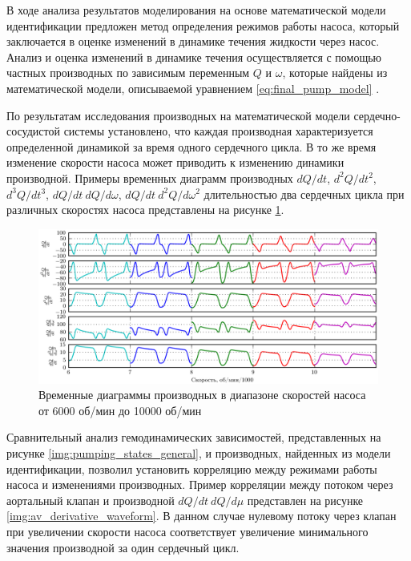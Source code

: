 
В ходе анализа результатов моделирования на основе математической модели идентификации предложен метод определения режимов работы насоса, который заключается в оценке изменений в динамике течения жидкости через насос. Анализ и оценка изменений в динамике течения осуществляется с помощью частных производных по зависимым переменным $Q$ и $\omega$, которые найдены из математической модели, описываемой уравнением \eqref{eq:final_pump_model} \cite{mt6_2014_main, rgc_2015}.

По результатам исследования производных на математической модели сердечно-сосудистой системы установлено, что каждая  производная характеризуется определенной динамикой за время одного сердечного цикла. В то же время изменение скорости насоса может приводить к изменению динамики производной. Примеры временных диаграмм производных $dQ/dt$, $d^2Q/dt^2$, $d^3Q/dt^3$, $dQ/dt~dQ/d\omega$, $dQ/dt~d^2Q/d\omega^2$ длительностью два сердечных цикла при различных скоростях насоса представлены на рисунке \ref{img:derivatives_waveform}.

\begin{figure}[ht] 
  \center
  \includegraphics [scale=1.0] {../images/c3_derivatives_waveform}
  \caption{Временные диаграммы производных в диапазоне скоростей насоса от 6000 об/мин до 10000 об/мин} 
  \label{img:derivatives_waveform}  
\end{figure}

Сравнительный анализ гемодинамических зависимостей, представленных  на рисунке \ref{img:pumping_states_general}, и производных, найденных из модели идентификации, позволил установить корреляцию между режимами работы насоса и изменениями производных. Пример корреляции между потоком через аортальный клапан и производной $dQ/dt~dQ/d\mu$ представлен на рисунке \ref{img:av_derivative_waveform}. В данном случае нулевому потоку через клапан при увеличении скорости насоса соответствует увеличение минимального значения производной за один сердечный цикл.

